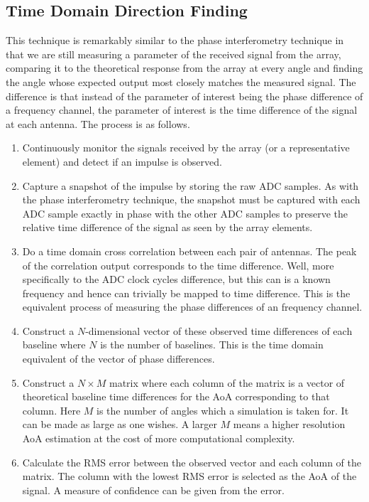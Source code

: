 \subsection{Time Domain Direction Finding}
This technique is remarkably similar to the phase interferometry technique in that we are still measuring a parameter of the received signal from the array, comparing it to the theoretical response from the array at every angle and finding the angle whose expected output most closely matches the measured signal. The difference is that instead of the parameter of interest being the phase difference of a frequency channel, the parameter of interest is the time difference of the signal at each antenna. The process is as follows.

\begin{enumerate}
  \item Continuously monitor the signals received by the array (or a representative element) and detect if an impulse is observed.
  \item Capture a snapshot of the impulse by storing the raw ADC samples. As with the phase interferometry technique, the snapshot must be captured with each ADC sample exactly in phase with the other ADC samples to preserve the relative time difference of the signal as seen by the array elements.
  \item Do a time domain cross correlation between each pair of antennas. The peak of the correlation output corresponds to the time difference. Well, more specifically to the ADC clock cycles difference, but this can is a known frequency and hence can trivially be mapped to time difference. This is the equivalent process of measuring the phase differences of an frequency channel.
  \item Construct a \(N\)-dimensional vector of these observed time differences of each baseline where \(N\) is the number of baselines. This is the time domain equivalent of the vector of phase differences.
  \item Construct a \(N \times M\) matrix where each column of the matrix is a vector of theoretical baseline time differences for the AoA corresponding to that column. Here \(M\) is the number of angles which a simulation is taken for. It can be made as large as one wishes. A larger \(M\) means a higher resolution AoA estimation at the cost of more computational complexity.
  \item Calculate the RMS error between the observed vector and each column of the matrix. The column with the lowest RMS error is selected as the AoA of the signal. A measure of confidence can be given from the error.
\end{enumerate}

